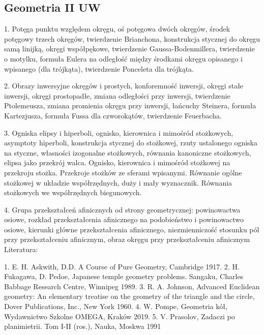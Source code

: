 
\subsection{Geometria II UW}
1. Potęga punktu względem okręgu, oś potęgowa dwóch okręgów, środek potęgowy trzech okręgów, twierdzenie Brianchona, konstrukcja stycznej do okręgu samą linijką, okręgi współpękowe, twierdzenie Gaussa-Bodenmillera, twierdzenie o motylku, formuła Eulera na odległość między środkami okręgu opisanego i wpisanego (dla trójkąta), twierdzenie Ponceleta dla trójkąta.

2. Obrazy inwersyjne okręgów i prostych, konforemność inwersji, okręgi stałe inwersji, okręgi prostopadłe, zmiana odległości przy inwersji, twierdzenie Ptolemeusza, zmiana promienia okręgu przy inwersji, łańcuchy Steinera, formuła Kartezjusza, formuła Fussa dla czworokątów, twierdzenie Feuerbacha.

3. Ogniska elipsy i hiperboli, ognisko, kierownica i mimośród stożkowych, asymptoty hiperboli, konstrukcja stycznej do stożkowej, rzuty ustalonego ogniska na styczne, własności izogonalne stożkowych, równania kanoniczne stożkowych, elipsa jako przekrój walca. Ognisko, kierownica i mimośród stożkowej na przekroju stożka. Przekroje stożków ze sferami wpisanymi. Równanie ogólne stożkowej w układzie współrzędnych, duży i mały wyznacznik. Równania stożkowych we współrzędnych biegunowych.

4. Grupa przekształceń afinicznych od strony geometrycznej: powinowactwa osiowe, rozkład przekształcenia afinicznego na podobieństwo i powinowactwo osiowe, kierunki główne przekształcenia afinicznego, niezmienniczość stosunku pól przy przekształceniu afinicznym, obraz okręgu przy przekształceniu afinicznym
Literatura: 	

1. E. H. Askwith, D.D. A Course of Pure Geometry, Cambridge 1917.
2. H. Fukagawa, D. Pedoe, Japanese temple geometry problems. Sangaku, Charles Babbage Research Centre, Winnipeg 1989.
3. R. A. Johnson, Advanced Euclidean geometry: An elementary treatise on the geometry of the triangle and the circle, Dover Publications, Inc., New York 1960.
4. W. Pompe, Geometria kół, Wydawnictwo Szkolne OMEGA, Kraków 2019.
5. V. Prasolov, Zadaczi po planimietrii. Tom I-II (ros.), Nauka, Moskwa 1991
